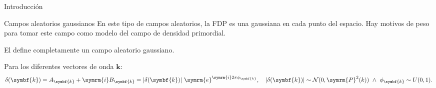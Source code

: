 \begin{frame}{Introducción}
    \begin{block}{Campos aleatorios gaussianos}
        En este tipo de campos aleatorios, la FDP es una gaussiana en cada punto del espacio. Hay motivos de peso para tomar este campo como modelo del campo de densidad primordial.
        \begin{center}
            El  define completamente un campo aleatorio gaussiano.
        \end{center}
        Para los diferentes vectores de onda \(\symbf{k}\):
        \begin{equation*}
            \delta(\symbf{k})=A_{\symbf{k}}+\symrm{i}B_{\symbf{k}}=\left|\delta(\symbf{k})\right|\,\symrm{e}^{\symrm{i}2\pi\phi_{\symbf{k}}},\quad \left|\delta(\symbf{k})\right|\sim\mathcal{N}(0,\symrm{P}^2(k))\ \wedge\ \phi_{\symbf{k}}\sim U(0,1).
        \end{equation*}
    \end{block}
\end{frame}